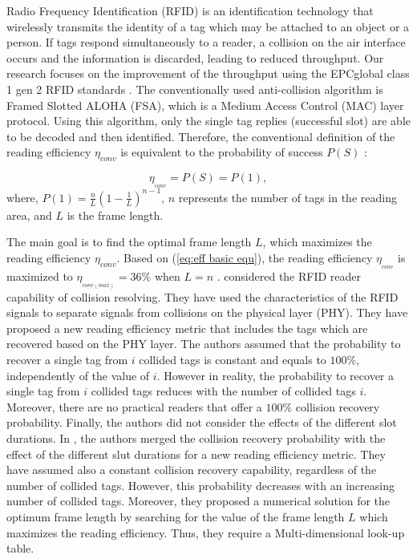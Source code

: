 \documentclass[10pt,conference,letterpaper]{RWWTemplate}
\begin{document}
Radio Frequency Identification (RFID) is an identification technology
that wirelessly transmits the identity of a tag which may be attached
to an object or a person. If tags respond simultaneously to a reader,
a collision on the air interface occurs and the information is discarded,
leading to reduced throughput. Our research focuses on the improvement
of the throughput using the EPCglobal class 1 gen 2 RFID standards
\cite{standard}. The conventionally used anti-collision algorithm
is Framed Slotted ALOHA (FSA), which is a Medium Access Control (MAC)
layer protocol. Using this algorithm, only the single tag replies
(successful slot) are able to be decoded and then identified. Therefore,
the conventional definition of the reading efficiency $\eta_{conv}$
is equivalent to the probability of success $P(S)$ \cite{Aloha4_Vogt}:

{\footnotesize{}
\begin{equation}
\eta_{_{conv}}=P(S)=P(1),\label{eq:eff basic equ}
\end{equation}
}where, {\footnotesize{}$P(1)=\frac{n}{L}\left(1-\frac{1}{L}\right)^{n-1}$},
$n$ represents the number of tags in the reading area, and $L$ is
the frame length. 

The main goal is to find the optimal frame length $L$, which maximizes
the reading efficiency $\eta_{conv}$. Based on (\ref{eq:eff basic equ}),
the reading efficiency $\eta_{_{conv}}$ is maximized to $\eta_{_{conv(max)}}=36\%$
when $L=n$ \cite{Aloha4_Vogt}. \cite{2012_journal_CR} considered
the RFID reader capability of collision resolving. They have used
the characteristics of the RFID signals to separate signals from collisions
on the physical layer (PHY). They have proposed a new reading efficiency
metric that includes the tags which are recovered based on the PHY
layer. The authors assumed that the probability to recover a single
tag from $i$ collided tags is constant and equals to $100\%$, independently
of the value of $i$. However in reality, the probability to recover
a single tag from $i$ collided tags reduces with the number of collided
tags $i$. Moreover, there are no practical readers that offer a $100\%$
collision recovery probability. Finally, the authors did not consider
the effects of the different slot durations. In \cite{CR_TA_2015},
the authors merged the collision recovery probability with the effect
of the different slut durations for a new reading efficiency metric.
They have assumed also a constant collision recovery capability, regardless
of the number of collided tags. However, this probability decreases
with an increasing number of collided tags. Moreover, they proposed
a numerical solution for the optimum frame length by searching for
the value of the frame length $L$ which maximizes the reading efficiency.
Thus, they require a Multi-dimensional look-up table.
\end{document}
